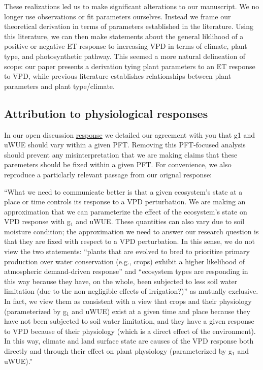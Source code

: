 \documentclass[12pt]{article}
\begin{document}
These realizations led us to make significant alterations to our
manuscript. We no longer use observations or fit parameters
ourselves. Instead we frame our theoretical derivation in terms of
parameters established in the literature. Using this literature, we
can then make statements about the general liklihood of a positive or
negative ET response to increasing VPD in terms of climate, plant
type, and photosynthetic pathway. This seemed a more natural
delineation of scope: our paper presents a derivation tying plant
parameters to an ET response to VPD, while previous literature
establishes relationships between plant parameters and plant
type/climate.

\subsection{Attribution to physiological responses}

In our open discussion
\href{https://editor.copernicus.org/index.php/hess-2018-553-AC1.pdf}{response}
we detailed our agreement with you that g1 and uWUE should vary within
a given PFT. Removing this PFT-focused analysis should prevent any
misinterpretation that we are making claims that these paremeters
should be fixed within a given PFT. For convenience, we also reproduce
a particlarly relevant passage from our orignal response:

``What we need to communicate better is that a given ecosystem's state
at a place or time controls its response to a VPD perturbation. We are
making an approximation that we can parameterize the effect of the
ecosystem's state on VPD response with g$_1$ and uWUE. These quantities
can also vary due to soil moisture condition; the approximation we
need to answer our research question is that they are fixed
with respect to a VPD perturbation. In this sense, we do not view the
two statements: ``plants that are evolved to bred to prioritize
primary production over water conservation (e.g., crops) exhibit a
higher likelihood of atmospheric demand-driven response'' and
``ecosystem types are responding in this way because they have, on the
whole, been subjected to less soil water limitation (due to the
non-negligible effects of irrigation?)'' as mutually exclusive. In
fact, we view them as consistent with a view that crops and their
physiology (parameterized by g$_1$ and uWUE) exist at a given time and
place because they have not been subjected to soil water limitation,
and they have a given response to VPD because of their physiology
(which is a direct effect of the environment). In this way, climate
and land surface state are causes of the VPD response both directly
and through their effect on plant physiology (parameterized by g$_1$
and uWUE).''
\end{document}
